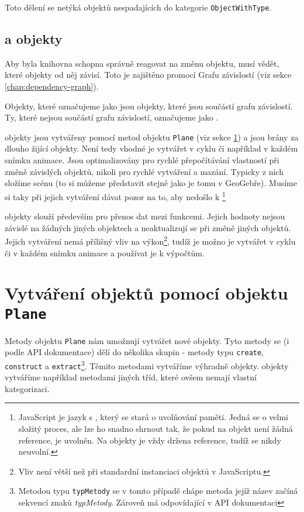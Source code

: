 Toto dělení se netýká objektů nespadajících do kategorie \texttt{ObjectWithType}.

\subsection[Bound a Unbound]{ a  objekty}
\label{subsec:bound-and-unbound}

Aby byla knihovna schopna správně reagovat na změnu objektu, musí vědět, které objekty od něj závisí.
Toto je zajištěno promocí Grafu závislostí (viz sekce \ref{chap:dependency-graph}).

Objekty, které označujeme jako  jsou objekty, které jsou součástí grafu závislostí.
Ty, které nejsou součástí grafu závislostí, označujeme jako .

 objekty jsou vytvářeny pomocí metod objektu \texttt{Plane} (viz sekce \ref{sec:creating-objects}) a jsou brány za dlouho žijící objekty. 
Není tedy vhodné je vytvářet v cyklu či například v každém snímku animace.
Jsou optimalizovány pro rychlé přepočítávání vlastností při změně závislých objektů, nikoli pro rychlé vytváření a mazání.
Typicky z nich složíme scénu (to si můžeme představit stejně jako je tomu v GeoGebře).
Musíme si taky při jejich vytváření dávat pozor na to, aby nedošlo k \footnote{JavaScript je jazyk s , který se stará o uvolňování paměti. Jedná se o velmi složitý proces, ale lze ho snadno shrnout tak, že pokud na objekt není žádná reference, je uvolněn. Na  objekty je vždy držena reference, tudíž se nikdy neuvolní.} 

 objekty slouží především pro přenos dat mezi funkcemi. 
Jejich hodnoty nejsou závislé na žádných jiných objektech a neaktualizují se při změně jiných objektů.
Jejich vytváření nemá přílišný vliv na výkon\footnote{Vliv není větší než při standardní instanciaci objektů v JavaScriptu.}, tudíž je možno je vytvářet v cyklu či v každém snímku animace a používat je k výpočtům.


\section[Vytváření]{Vytváření objektů pomocí objektu \texttt{Plane}}
\label{sec:creating-objects}

Metody objektu \texttt{Plane} nám umožnují vytvářet nové objekty. 
Tyto metody se (i podle API dokumentace) dělí do několika skupin - metody typu \texttt{create}, \texttt{construct} a \texttt{extract}\footnote{Metodou typu \texttt{typMetody} se v tomto případě chápe metoda jejíž název začíná sekvencí znaků \textit{typMetody}. Zároveň má odpovídající  v API dokumentaci}.
Těmito metodami vytváříme výhradně  objekty. 
 objekty vytváříme například metodami jiných tříd, které ovšem nemají vlastní kategorizaci.

